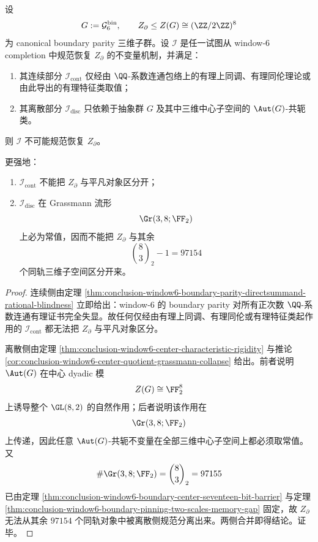 \begin{theorem}[有理--自同构双盲]\label{thm:conclusion-window6-rational-automorphism-double-blindness}
设
\[
G:=\mathcal G_6^{\mathrm{bin}},
\qquad
Z_{\partial}\le Z(G)\cong (\ZZ/2\ZZ)^8
\]
为 canonical boundary parity 三维子群。设 \(\mathcal I\) 是任一试图从 window-\(6\) completion 中规范恢复 \(Z_{\partial}\) 的不变量机制，并满足：
\begin{enumerate}
  \item 其连续部分 \(\mathcal I_{\mathrm{cont}}\) 仅经由 \(\QQ\)-系数连通包络上的有理上同调、有理同伦理论或由此导出的有理特征类取值；
  \item 其离散部分 \(\mathcal I_{\mathrm{disc}}\) 只依赖于抽象群 \(G\) 及其中三维中心子空间的 \(\Aut(G)\)-共轭类。
\end{enumerate}
则 \(\mathcal I\) 不可能规范恢复 \(Z_{\partial}\)。

更强地：
\begin{enumerate}
  \item \(\mathcal I_{\mathrm{cont}}\) 不能把 \(Z_{\partial}\) 与平凡对象区分开；
  \item \(\mathcal I_{\mathrm{disc}}\) 在 Grassmann 流形
  \[
  \Gr(3,8;\FF_2)
  \]
  上必为常值，因而不能把 \(Z_{\partial}\) 与其余
  \[
  \binom{8}{3}_2-1=97154
  \]
  个同轨三维子空间区分开来。
\end{enumerate}
\end{theorem}
\begin{proof}
连续侧由定理 \ref{thm:conclusion-window6-boundary-parity-directsummand-rational-blindness} 立即给出：window-\(6\) 的 boundary parity 对所有正次数 \(\QQ\)-系数连通有理证书完全失显。故任何仅经由有理上同调、有理同伦或有理特征类起作用的 \(\mathcal I_{\mathrm{cont}}\) 都无法把 \(Z_{\partial}\) 与平凡对象区分。

离散侧由定理 \ref{thm:conclusion-window6-center-characteristic-rigidity} 与推论 \ref{cor:conclusion-window6-center-quotient-grassmann-collapse} 给出。前者说明 \(\Aut(G)\) 在中心 dyadic 模
\[
Z(G)\cong \FF_2^8
\]
上诱导整个 \(\GL(8,2)\) 的自然作用；后者说明该作用在
\[
\Gr(3,8;\FF_2)
\]
上传递，因此任意 \(\Aut(G)\)-共轭不变量在全部三维中心子空间上都必须取常值。又
\[
\#\Gr(3,8;\FF_2)=\binom{8}{3}_2=97155
\]
已由定理 \ref{thm:conclusion-window6-boundary-center-seventeen-bit-barrier} 与定理 \ref{thm:conclusion-window6-boundary-pinning-two-scales-memory-gap} 固定，故 \(Z_{\partial}\) 无法从其余 \(97154\) 个同轨对象中被离散侧规范分离出来。两侧合并即得结论。证毕。
\end{proof}

